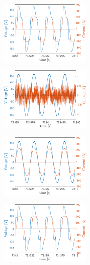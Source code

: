 \begin{figure}[!b] %
	\centering
	\includegraphics[width=0.4\textwidth]{Figures/artigo_unfilt_2.eps}
	\caption{}
	\label{fig:artigo_unfilt_2.eps}
\end{figure}

\begin{figure}[!b] %
	\centering
	\includegraphics[width=0.4\textwidth]{Figures/artigo_filt_1.eps}
	\caption{}
	\label{fig:artigo_filt_1.eps}
\end{figure}

\begin{figure}[!b] %
	\centering
	\includegraphics[width=0.4\textwidth]{Figures/artigo_filt_2.eps}
	\caption{}
	\label{fig:artigo_filt_2.eps}
\end{figure}

\begin{figure}[!b] %
	\centering
	\includegraphics[width=0.4\textwidth]{Figures/artigo_unfilt_3.eps}
	\caption{}
	\label{fig:artigo_unfilt_3.eps}
\end{figure}

